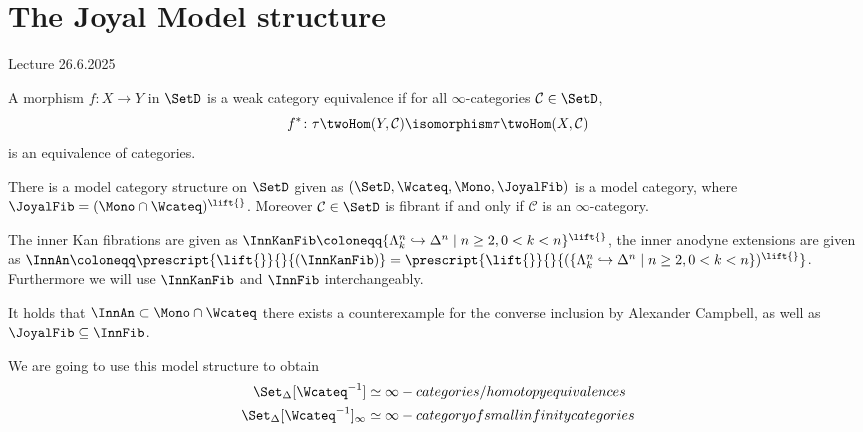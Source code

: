 \section{The Joyal Model structure}
Lecture 26.6.2025


\begin{defi}
	\cite[Thm 3.6.8]{Cisinski_2019}
	A morphism $ f \colon X \to Y $ in $ \SetD $ is a weak category equivalence if for all $ \infty $-categories $ \mathcal{ C } \in \SetD $,
	\[
		f^* \colon \tau \twoHom ( Y , \mathcal{ C } )
		\isomorphism 
		\tau \twoHom ( X , \mathcal{ C } )
	\]
	is an equivalence of categories.
\end{defi}

\begin{thm}
	There is a model category structure on $ \SetD $ given as $ ( \SetD , \Wcateq, \Mono , \JoyalFib ) $ is a model category,
	where $ \JoyalFib = ( \Mono \cap \Wcateq )^{ \lift{} }$.
	Moreover $ \mathcal{ C } \in \SetD $ is fibrant if and only if $ \mathcal{ C } $ is an $ \infty $-category.
\end{thm}

\begin{defi}
	The inner Kan fibrations are given as $ \InnKanFib \coloneqq \{ \Lambda_k^n \hookrightarrow \Delta^n \mid n \geq 2 , 0 < k < n \}^{ \lift{ } } $, the inner anodyne extensions are given as $ \InnAn \coloneqq \prescript{ \lift { } }{}{ ( \InnKanFib ) } = \prescript{ \lift{ } }{}{ ( \{ \Lambda_k^n \hookrightarrow \Delta^n \mid n \geq 2 , 0 < k < n \} )^{ \lift{} } } $.
	Furthermore we will use $ \InnKanFib $ and $ \InnFib $ interchangeably.
\end{defi}

\begin{Warning}
	It holds that $ \InnAn \subset \Mono \cap \Wcateq $ there exists a counterexample for the converse inclusion by Alexander Campbell, as well as $ \JoyalFib \subseteq \InnFib $.
\end{Warning}

We are going to use this model structure to obtain 
\begin{align*}
	\Set_\Delta [ \Wcateq^{ - 1 } ] &\simeq \infty-categories / homotopy equivalences
	\\
	\Set_\Delta [ \Wcateq^{ - 1 } ]_\infty &\simeq \infty-category of small infinity categories
\end{align*}

